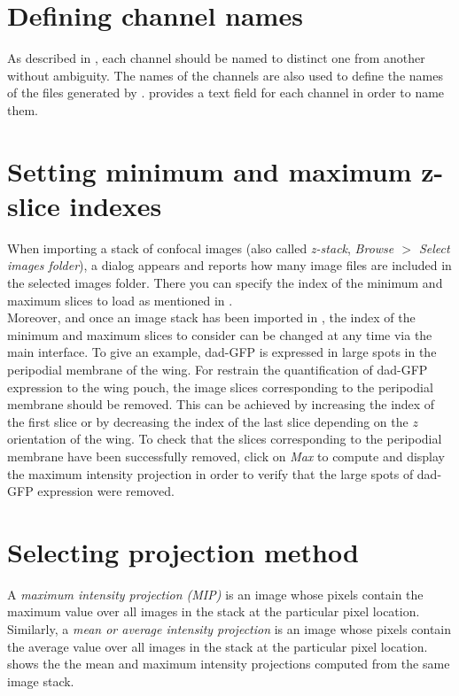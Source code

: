 \section{Defining channel names} \label{sec:structure_convention_experiment_channel_names}
As described in , each channel should be named to distinct one from another without ambiguity. The names of the channels are also used to define the names of the files generated by \wingj. \wingj provides a text field for each channel in order to name them.

\section{Setting minimum and maximum z-slice indexes}\label{sec:structure_slice_index}
When importing a stack of confocal images (also called \emph{z-stack}, \textit{Browse $>$ Select images folder}), a dialog appears and reports how many image files are included in the selected images folder. There you can specify the index of the minimum and maximum slices to load as mentioned in .\\

Moreover, and once an image stack has been imported in \wingj, the index of the minimum and maximum slices to consider can be changed at any time via the main interface. To give an example, dad-GFP is expressed in large spots in the peripodial membrane of the \droso wing. For restrain the quantification of dad-GFP expression to the wing pouch, the image slices corresponding to the peripodial membrane should be removed. This can be achieved by increasing the index of the first slice or by decreasing the index of the last slice depending on the $z$ orientation of the wing. To check that the slices corresponding to the peripodial membrane have been successfully removed, click on \textit{Max} to compute and display the maximum intensity projection in order to verify that the large spots of dad-GFP expression were removed.

\section{Selecting projection method}\label{sec:structure_projections}
A \textit{maximum intensity projection (MIP)} is an image whose pixels contain the maximum value over all images in the stack at the particular pixel location. Similarly, a \textit{mean or average intensity projection} is an image whose pixels contain the average value over all images in the stack at the particular pixel location.  shows the the mean and maximum intensity projections computed from the same image stack.\\

